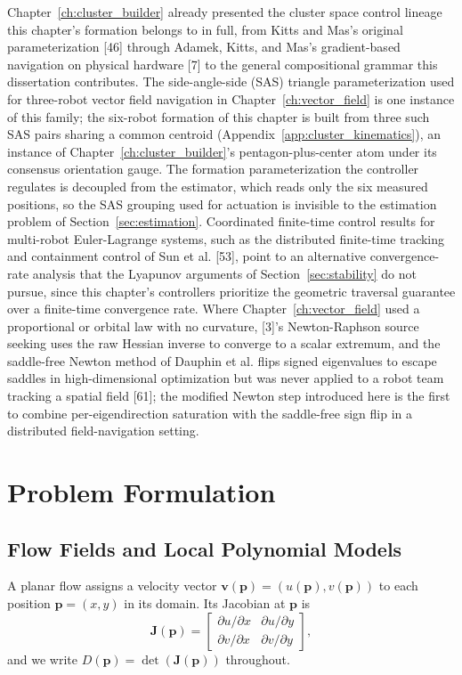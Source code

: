 \documentclass[12pt, letterpaper, oneside]{report}
\begin{document}
Chapter~\ref{ch:cluster_builder} already presented the cluster space
control lineage this chapter's formation belongs to in full, from Kitts
and Mas's original parameterization [46] through Adamek, Kitts, and Mas's
gradient-based navigation on physical hardware [7] to the general
compositional grammar this dissertation contributes. The side-angle-side
(SAS) triangle parameterization used for three-robot vector field
navigation in Chapter~\ref{ch:vector_field} is one instance of this family;
the six-robot formation of this chapter is built from three such SAS pairs
sharing a common centroid (Appendix~\ref{app:cluster_kinematics}), an
instance of Chapter~\ref{ch:cluster_builder}'s pentagon-plus-center atom
under its consensus orientation gauge. The formation parameterization the
controller regulates is decoupled from the estimator, which reads only the
six measured positions, so the SAS grouping used for actuation is invisible
to the estimation problem of Section~\ref{sec:estimation}. Coordinated
finite-time control results for multi-robot Euler-Lagrange systems, such as
the distributed finite-time tracking and containment control of Sun et al.
[53], point to an alternative convergence-rate analysis that the Lyapunov
arguments of Section~\ref{sec:stability} do not pursue, since this
chapter's controllers prioritize the geometric traversal guarantee over a
finite-time convergence rate. Where Chapter~\ref{ch:vector_field} used a
proportional or orbital law with no curvature, [3]'s Newton-Raphson source
seeking uses the raw Hessian inverse to converge to a scalar extremum, and
the saddle-free Newton method of Dauphin et al. flips signed eigenvalues to
escape saddles in high-dimensional optimization but was never applied to a
robot team tracking a spatial field [61]; the modified Newton step
introduced here is the first to combine per-eigendirection saturation with
the saddle-free sign flip in a distributed field-navigation setting.

\section{Problem Formulation}
\label{sec:detj_field}

\subsection{Flow Fields and Local Polynomial Models}

A planar flow assigns a velocity vector
$\mathbf{v}(\mathbf{p})=(u(\mathbf{p}),v(\mathbf{p}))$ to each position
$\mathbf{p}=(x,y)$ in its domain. Its Jacobian at $\mathbf{p}$ is
\begin{equation}
\mathbf{J}(\mathbf{p}) = \begin{bmatrix} \partial u/\partial x & \partial u/\partial y \\ \partial v/\partial x & \partial v/\partial y \end{bmatrix},
\label{eq:jacobian}
\end{equation}
and we write $D(\mathbf{p})=\det(\mathbf{J}(\mathbf{p}))$ throughout.
\end{document}
